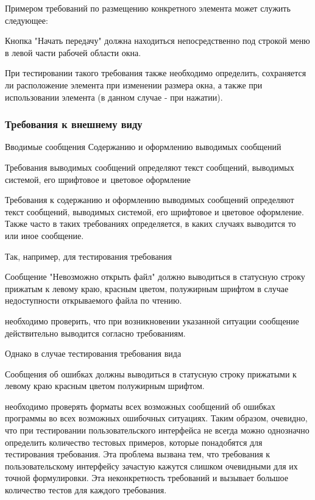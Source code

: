 \documentclass{../industrial-development}
\begin{document}
Примером требований по размещению конкретного элемента может служить следующее:

Кнопка "Начать передачу" должна находиться непосредственно под строкой меню в левой части рабочей области окна.

При тестировании такого требования также необходимо определить, сохраняется ли расположение элемента при изменении размера окна, а также при использовании элемента (в данном случае - при нажатии).

\begin{frame} \frametitle{Требования к внешнему виду}
  \begin{block}{Вводимые сообщения}
   Содержанию и оформлению выводимых сообщений
  \end{block}
Требования выводимых сообщений определяют текст сообщений, выводимых системой, его шрифтовое и~цветовое оформление
\end{frame}

\lecturenotes

Требования к содержанию и оформлению выводимых сообщений определяют текст сообщений, выводимых системой, его шрифтовое и цветовое оформление. Также часто в таких требованиях определяется, в каких случаях выводится то или иное сообщение.

Так, например, для тестирования требования

Сообщение "Невозможно открыть файл" должно выводиться в статусную строку прижатым к левому краю, красным цветом, полужирным шрифтом в случае недоступности открываемого файла по чтению.

необходимо проверить, что при возникновении указанной ситуации сообщение действительно выводится согласно требованиям.

Однако в случае тестирования требования вида

Сообщения об ошибках должны выводиться в статусную строку прижатыми к левому краю красным цветом полужирным шрифтом.

необходимо проверять форматы всех возможных сообщений об ошибках программы во всех возможных ошибочных ситуациях. Таким образом, очевидно, что при тестировании пользовательского интерфейса не всегда можно однозначно определить количество тестовых примеров, которые понадобятся для тестирования требования. Эта проблема вызвана тем, что требования к пользовательскому интерфейсу зачастую кажутся слишком очевидными для их точной формулировки. Эта неконкретность требований и вызывает большое количество тестов для каждого требования.
\end{document}
